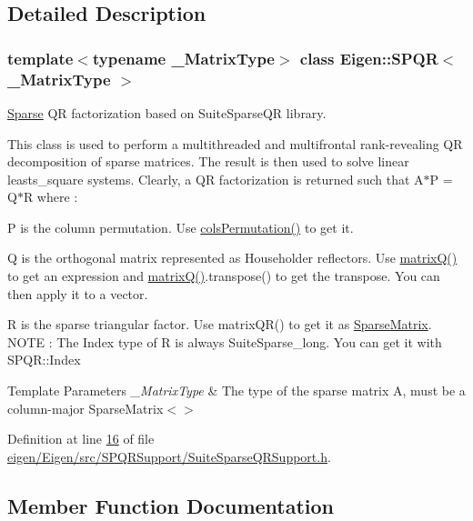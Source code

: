 \subsection{Detailed Description}
\subsubsection*{template$<$typename \+\_\+\+Matrix\+Type$>$\newline
class Eigen\+::\+S\+P\+Q\+R$<$ \+\_\+\+Matrix\+Type $>$}

\hyperlink{struct_eigen_1_1_sparse}{Sparse} QR factorization based on Suite\+Sparse\+QR library. 

This class is used to perform a multithreaded and multifrontal rank-\/revealing QR decomposition of sparse matrices. The result is then used to solve linear leasts\+\_\+square systems. Clearly, a QR factorization is returned such that A$\ast$P = Q$\ast$R where \+:

P is the column permutation. Use \hyperlink{class_eigen_1_1_s_p_q_r_ab1b7f54ba1cd8d77506ae676fea4fec0}{cols\+Permutation()} to get it.

Q is the orthogonal matrix represented as Householder reflectors. Use \hyperlink{class_eigen_1_1_s_p_q_r_a93dbf1b487e28948e1ca2a33a35b6a54}{matrix\+Q()} to get an expression and \hyperlink{class_eigen_1_1_s_p_q_r_a93dbf1b487e28948e1ca2a33a35b6a54}{matrix\+Q()}.transpose() to get the transpose. You can then apply it to a vector.

R is the sparse triangular factor. Use matrix\+Q\+R() to get it as \hyperlink{group___sparse_core___module_class_eigen_1_1_sparse_matrix}{Sparse\+Matrix}. N\+O\+TE \+: The Index type of R is always Suite\+Sparse\+\_\+long. You can get it with S\+P\+Q\+R\+::\+Index


\begin{DoxyTemplParams}{Template Parameters}
{\em \+\_\+\+Matrix\+Type} & The type of the sparse matrix A, must be a column-\/major Sparse\+Matrix$<$$>$\\
\hline
\end{DoxyTemplParams}


Definition at line \hyperlink{eigen_2_eigen_2src_2_s_p_q_r_support_2_suite_sparse_q_r_support_8h_source_l00016}{16} of file \hyperlink{eigen_2_eigen_2src_2_s_p_q_r_support_2_suite_sparse_q_r_support_8h_source}{eigen/\+Eigen/src/\+S\+P\+Q\+R\+Support/\+Suite\+Sparse\+Q\+R\+Support.\+h}.



\subsection{Member Function Documentation}
\mbox{\label{class_eigen_1_1_s_p_q_r_a8c7d48d51a1fb08a3e27b8499e5c7f49}} 
